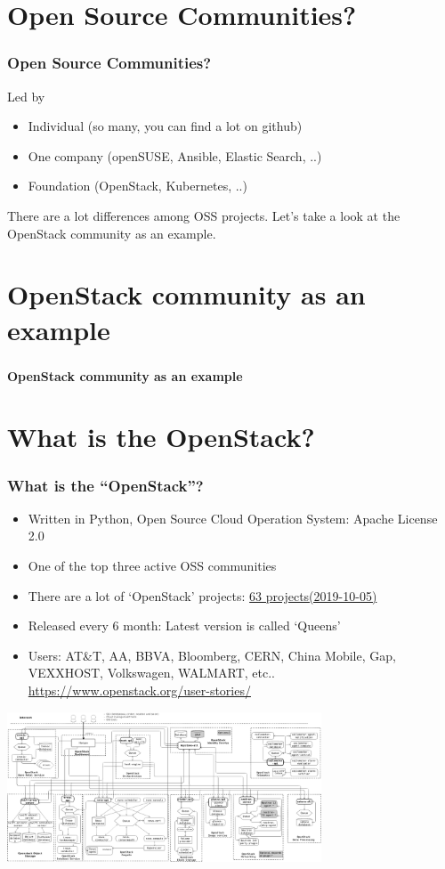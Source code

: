 \documentclass[aspectratio=169,11pt,hyperref={colorlinks=true}]{beamer}
\begin{document}
\section{Open Source Communities?}
\begin{frame}
  \frametitle{Open Source Communities?}
  Led by
  \begin{itemize}
    \item Individual (so many, you can find a lot on github)
    \item One company (openSUSE, Ansible, Elastic Search, ..)
    \item Foundation (OpenStack, Kubernetes, ..)
  \end{itemize}
  There are a lot differences among OSS projects. Let's take a look at the OpenStack community as an example.
\end{frame}

\section{OpenStack community as an example}
\begin{frame}
  \frametitle{ }
  \Huge{\bf{OpenStack community as an example}}
\end{frame}

\section{What is the OpenStack?}
\begin{frame}
  \frametitle{What is the ``OpenStack''?}
  \begin{itemize}
    \item Written in Python, Open Source Cloud Operation System: Apache License 2.0
    \item One of the top three active OSS communities
    \item There are a lot of `OpenStack' projects: \href{http://governance.openstack.org/reference/projects/index.html}{63 projects(2019-10-05)}
    \item Released every 6 month: Latest version is called `Queens'
    \item Users: \scriptsize{AT\&T, AA, BBVA, Bloomberg, CERN,
      China Mobile, Gap, VEXXHOST,
      Volkswagen, WALMART, etc.. \url{https://www.openstack.org/user-stories/}}
  \end{itemize}
  \begin{center}
    \includegraphics[width=0.7\textwidth]{images/openstack-arch-kilo-logical-v1.png}
  \end{center}
\end{frame}
\end{document}
